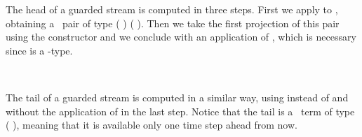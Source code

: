 The head of a guarded stream  is computed in three steps. First
we apply  to , obtaining a \GTT\ pair of type  ( )   ( ). Then we take the first projection of this pair using the constructor  and we conclude with an application of , which is necessary since  is a -type.
\begin{code}%
\>[0]\AgdaSpace{}%
\AgdaSymbol{:}\AgdaSpace{}%
\AgdaSymbol{\{}\AgdaSpace{}%
\AgdaSymbol{:}\AgdaSpace{}%
\AgdaSpace{}%
\AgdaSymbol{\}}\AgdaSpace{}%
\AgdaSymbol{\{}\AgdaSpace{}%
\AgdaSymbol{:}\AgdaSpace{}%
\AgdaSpace{}%
\AgdaSymbol{\}}\AgdaSpace{}%
\AgdaSpace{}%
\AgdaSpace{}%
\AgdaSymbol{(}\AgdaSpace{}%
\AgdaSymbol{)}\AgdaSpace{}%
\AgdaSymbol{(}\AgdaSpace{}%
\AgdaSymbol{)}\AgdaSpace{}%
\AgdaSpace{}%
\AgdaSpace{}%
\AgdaSpace{}%
\<%
\\
\>[0]\AgdaSpace{}%
\AgdaSymbol{\{}\AgdaSymbol{\}\{}\AgdaSymbol{\}}\AgdaSpace{}%
\AgdaSpace{}%
\AgdaSymbol{=}\AgdaSpace{}%
\AgdaSpace{}%
\AgdaSymbol{(}\AgdaSpace{}%
\AgdaSymbol{(}\AgdaSpace{}%
\AgdaSymbol{((}\AgdaSpace{}%
\AgdaSymbol{(}\AgdaSpace{}%
\AgdaSymbol{))}\AgdaSpace{}%
\AgdaSpace{}%
\AgdaSymbol{(}\AgdaSpace{}%
\AgdaSymbol{))}\AgdaSpace{}%
\AgdaSymbol{))}\<%
\end{code}
The tail of a guarded stream is computed in a similar way, using  instead of  and without the application of  in the last step. Notice that the tail is a \GTT\ term of type  ( ), meaning that it is available only one time step ahead from now.
